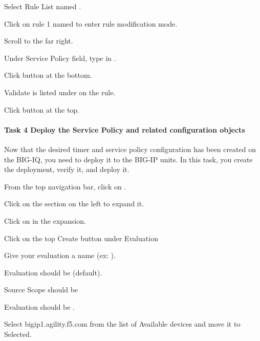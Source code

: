 \documentclass[letterpaper,10pt,english]{sphinxmanual}
\begin{document}
Select Rule List named .

Click on rule 1 named  to enter rule
modification mode.

Scroll to the far right.

Under Service Policy field, type in .

Click  button at the bottom.

Validate  is listed under  on the
rule.


Click  button at the top.


\paragraph{Task 4 \textendash{} Deploy the Service Policy and related configuration objects}
\label{\detokenize{class1/module5/lab2:task-4-deploy-the-service-policy-and-related-configuration-objects}}
Now that the desired timer and service policy configuration has been
created on the BIG-IQ, you need to deploy it to the BIG-IP units. In
this task, you create the deployment, verify it, and deploy it.

From the top navigation bar, click on .

Click on the  section on the left to expand it.

Click on  in the expansion.

Click on the top Create button under Evaluation

Give your evaluation a name (ex: ).

Evaluation  should be  (default).

Source Scope should be 

Evaluation  should be .

Select bigip1.agility.f5.com from the list of Available devices and move
it to Selected.

\end{document}
